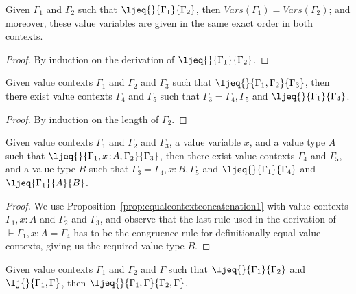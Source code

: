 \begin{proposition}
\label{prop:setsofvariablesofequalcontexts}
Given $\Gamma_1$ and $\Gamma_2$ such that ${\ljeq {} {\Gamma_1} {\Gamma_2}}$, then $V\!ars(\Gamma_1) = V\!ars(\Gamma_2)$; and moreover, these value variables  
are given in the same exact order in both contexts.
\end{proposition}

\begin{proof}
By induction on the derivation of $\ljeq {} {\Gamma_1} {\Gamma_2}$.
\end{proof}

\begin{proposition}
\label{prop:equalcontextconcatenation1}
Given value contexts $\Gamma_1$ and $\Gamma_2$ and $\Gamma_3$ such that $\ljeq {} {\Gamma_1, \Gamma_2} {\Gamma_3}$, then there exist value contexts $\Gamma_4$ and $\Gamma_5$ such that $\Gamma_3 = \Gamma_4, \Gamma_5$ and $\ljeq {} {\Gamma_1} {\Gamma_4}$.
\end{proposition}

\begin{proof}
By induction on the length of $\Gamma_2$. 
\end{proof}

\begin{corollary}
\label{cor:equalcontextconcatenation2}
Given value contexts $\Gamma_1$ and $\Gamma_2$ and $\Gamma_3$, a value variable $x$, and a value type $A$ such that $\ljeq {} {\Gamma_1, x \!:\! A, \Gamma_2} {\Gamma_3}$, then there exist value contexts $\Gamma_4$ and $\Gamma_5$, and a value type $B$ such that $\Gamma_3 = \Gamma_4, x \!:\! B, \Gamma_5$ and $\ljeq {} {\Gamma_1} {\Gamma_4}$ and $\ljeq {\Gamma_1} {A} {B}$.
\end{corollary}

\begin{proof}
We use Proposition~\ref{prop:equalcontextconcatenation1} with value contexts $\Gamma_1, x \!:\! A$ and $\Gamma_2$ and $\Gamma_3$, and observe that the last rule used in the derivation of $\vdash {\Gamma_1, x \!:\! A} = \Gamma_4$ has to be the congruence rule for definitionally equal value contexts, giving us the required value type $B$.
\end{proof}

\begin{proposition}
\label{prop:contextextensionwithcontext}
Given value contexts $\Gamma_1$ and $\Gamma_2$ and $\Gamma$ such that $\ljeq {} {\Gamma_1} {\Gamma_2}$ and $\lj {} {\Gamma_1,\Gamma}$, then $\ljeq {} {\Gamma_1,\Gamma} {\Gamma_2,\Gamma}$.
\end{proposition}

